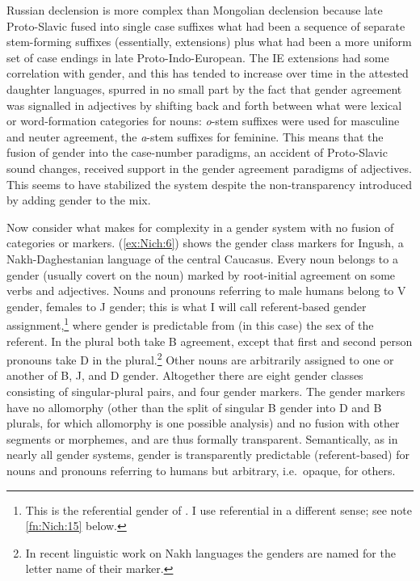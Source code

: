 \documentclass[output=collectionpaper]{langsci/langscibook}
\begin{document}
Russian declension is more complex than Mongolian declension because late Proto-Slavic fused into single case suffixes what had been a sequence of separate stem-forming suffixes (essentially, extensions) plus what had been a more uniform set of case endings in late Proto-Indo-European. The IE extensions had some correlation with gender, and this has tended to increase over time in the attested daughter languages, spurred in no small part by the fact that gender agreement was signalled in adjectives by shifting back and forth between what were lexical or word-formation categories for nouns: \textit{o}-stem suffixes were used for masculine and neuter agreement, the \textit{a}-stem suffixes for feminine. This means that the fusion of gender into the case-number paradigms, an accident of Proto-Slavic sound changes, received support in the gender agreement paradigms of adjectives. This seems to have stabilized the system despite the non-transparency introduced by adding gender to the mix.

Now consider what makes for complexity in a gender system with no fusion of categories or markers. (\ref{ex:Nich:6}) shows the gender class markers for Ingush, a Nakh-Daghestanian language of the central Caucasus. Every noun belongs to a gender (usually covert on the noun) marked by root-initial agreement on some verbs and adjectives. Nouns and pronouns referring to male humans belong to V gender, females to J gender; this is what I will call referent-based gender assignment,\footnote{%
This is the referential gender of \citet{Dahl2000a}.  I use referential in a different sense; see note \ref{fn:Nich:15} below.
} %
where gender is predictable from (in this case) the sex of the referent.  In the plural both take B agreement, except that first and second person pronouns take D in the plural.\footnote{%
In recent linguistic work on Nakh languages the genders are named for the letter name of their marker.
} %
Other nouns are arbitrarily assigned to one or another of B, J, and D gender. Altogether there are eight gender classes consisting of singular-plural pairs, and four gender markers. The gender markers have no allomorphy (other than the split of singular B gender into D and B plurals, for which allomorphy is one possible analysis) and no fusion with other segments or morphemes, and are thus formally transparent. Semantically, as in nearly all gender systems, gender is transparently predictable (referent-based) for nouns and pronouns referring to humans but arbitrary, i.e.\ opaque, for others.
\end{document}
